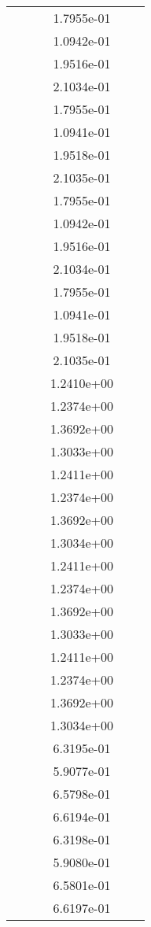 \begin{xltabular}{\textwidth}{r|rS[table-format=1.3e+2]S[table-format=1.4e+2]S[table-format=1.4e+2]S[table-format=-1.5]}
&  &  & 1.7955e-01 & & \\
&  &  & 1.0942e-01 & & \\
&  &  & 1.9516e-01 & & \\
&  &  & 2.1034e-01 & & \\
&  &  & 1.7955e-01 & & \\
&  &  & 1.0941e-01 & & \\
&  &  & 1.9518e-01 & & \\
&  &  & 2.1035e-01 & & \\
&  &  & 1.7955e-01 & & \\
&  &  & 1.0942e-01 & & \\
&  &  & 1.9516e-01 & & \\
&  &  & 2.1034e-01 & & \\
&  &  & 1.7955e-01 & & \\
&  &  & 1.0941e-01 & & \\
&  &  & 1.9518e-01 & & \\
&  &  & 2.1035e-01 & & \\
&  &  & 1.2410e+00 & & \\
&  &  & 1.2374e+00 & & \\
&  &  & 1.3692e+00 & & \\
&  &  & 1.3033e+00 & & \\
&  &  & 1.2411e+00 & & \\
&  &  & 1.2374e+00 & & \\
&  &  & 1.3692e+00 & & \\
&  &  & 1.3034e+00 & & \\
&  &  & 1.2411e+00 & & \\
&  &  & 1.2374e+00 & & \\
&  &  & 1.3692e+00 & & \\
&  &  & 1.3033e+00 & & \\
&  &  & 1.2411e+00 & & \\
&  &  & 1.2374e+00 & & \\
&  &  & 1.3692e+00 & & \\
&  &  & 1.3034e+00 & & \\
&  &  & 6.3195e-01 & & \\
&  &  & 5.9077e-01 & & \\
&  &  & 6.5798e-01 & & \\
&  &  & 6.6194e-01 & & \\
&  &  & 6.3198e-01 & & \\
&  &  & 5.9080e-01 & & \\
&  &  & 6.5801e-01 & & \\
&  &  & 6.6197e-01 & & \\

\end{xltabular}

